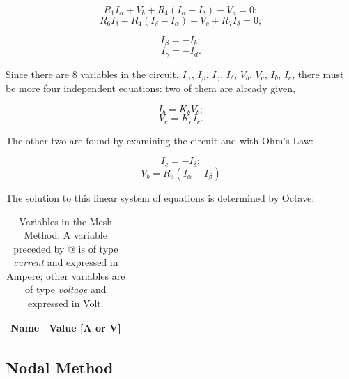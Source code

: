 \begin{equation}
  R_1I_{\alpha} + V_b + R_4(I_{\alpha}-I_{\delta}) - V_a = 0;
  \label{eq:MM_Alpha}
\end{equation}
\begin{equation}
  R_6I_{\delta} + R_4(I_{\delta}-I_{\alpha}) + V_c + R_7I_{\delta} = 0;
  \label{eq:MM_Delta}
\end{equation}

\begin{equation}
  I_{\beta} = - I_b;
  \label{eq:MM_Beta}
\end{equation}
\begin{equation}
  I_{\gamma} = - I_d.
  \label{eq:MM_Gamma}
\end{equation}

Since there are 8 variables in the circuit, $I_{\alpha}$, $I_{\beta}$, $I_{\gamma}$, $I_{\delta}$, $V_b$, $V_c$, $I_b$, $I_c$, there must be more four independent equations: two of them are already given,

\begin{equation}
  I_b = K_bV_b;
  \label{eq:Vb_Ib}
\end{equation}
\begin{equation}
  V_c = K_cI_c.
  \label{eq:Vc_Ic}
\end{equation}

The other two are found by examining the circuit and with Ohm's Law:

\begin{equation}
  I_c = - I_{\delta};
  \label{eq:MM_Ic}
\end{equation}
\begin{equation}
  V_b = R_3(I_{\alpha}-I_{\beta})
  \label{eq:MM_Vb}
\end{equation}

The solution to this linear system of equations is determined by Octave:

\begin{table}[h]
  \centering
  \begin{tabular}{|l|r|}
    \hline    
    {\bf Name} & {\bf Value [A or V]} \\ \hline
    
  \end{tabular}
  \caption{Variables in the Mesh Method. A variable preceded by @ is of type {\em current} and expressed in Ampere; other variables are of type {\em voltage} and expressed in Volt.}
  \label{tab:malhas}
\end{table}

\subsection{Nodal Method}

